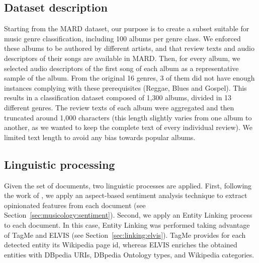 \subsection{Dataset description}
\label{sec:similarity:mard}

Starting from the MARD dataset, our purpose is to create a subset suitable for music genre classification, including 100 albums per genre class. We enforced these albums to be authored by different artists, and that review texts and audio descriptors of their songs are available in MARD. Then, for every album, we selected audio descriptors of the first song of each album as a representative sample of the album. From the original 16 genres, 3 of them did not have enough instances complying with these prerequisites (Reggae, Blues and Gospel). This results in a classification dataset composed of 1,300 albums, divided in 13 different genres. The review texts of each album were aggregated and then truncated around 1,000 characters (this length slightly varies from one album to another, as we wanted to keep the complete text of every individual review). We limited text length to avoid any bias towards popular albums.


\subsection{Linguistic processing}
\label{sec:similarity:processing}

Given the set of documents, two linguistic processes are applied. First, following the work of \cite{DongSOS13,DongOS14}, we apply an aspect-based sentiment analysis technique to extract opinionated features from each document (see Section~\ref{sec:musicology:sentiment}). Second, we apply an Entity Linking process to each document. In this case, Entity Linking was performed taking advantage of TagMe \citep{Ferragina2012} and ELVIS (see Section~\ref{sec:linking:elvis}). TagMe provides for each detected entity its Wikipedia page id, whereas ELVIS enriches the obtained entities with DBpedia URIs, DBpedia Ontology types, and Wikipedia categories.

